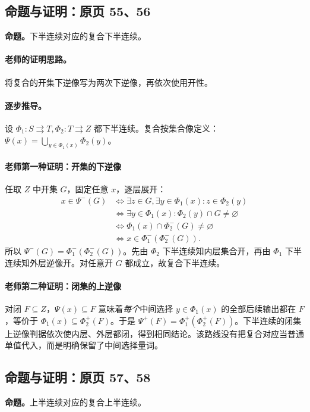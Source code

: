 \subsection{命题与证明：原页 55、56}

\textbf{命题。}下半连续对应的复合下半连续。

\paragraph{老师的证明思路。}将复合的开集下逆像写为两次下逆像，再依次使用开性。

\paragraph{逐步推导。}
设 $\Phi_1:S\rightrightarrows T,\Phi_2:T\rightrightarrows Z$ 都下半连续。复合按集合像定义：$\Psi(x)=\bigcup_{y\in\Phi_1(x)}\Phi_2(y)$。
\paragraph{老师第一种证明：开集的下逆像}
任取 $Z$ 中开集 $G$，固定任意 $x$，逐层展开：
\begin{align*}
x\in\Psi^-(G)&\iff\exists z\in G,\exists y\in\Phi_1(x):z\in\Phi_2(y)\\
&\iff\exists y\in\Phi_1(x):\Phi_2(y)\cap G\ne\varnothing\\
&\iff\Phi_1(x)\cap\Phi_2^-(G)\ne\varnothing\\
&\iff x\in\Phi_1^-(\Phi_2^-(G)).
\end{align*}
所以 $\Psi^-(G)=\Phi_1^-(\Phi_2^-(G))$。先由 $\Phi_2$ 下半连续知内层集合开，再由 $\Phi_1$ 下半连续知外层逆像开。对任意开 $G$ 都成立，故复合下半连续。
\paragraph{老师第二种证明：闭集的上逆像}
对闭 $F\subseteq Z$，$\Psi(x)\subseteq F$ 意味着\emph{每个}中间选择 $y\in\Phi_1(x)$ 的全部后续输出都在 $F$，等价于 $\Phi_1(x)\subseteq\Phi_2^+(F)$。于是 $\Psi^+(F)=\Phi_1^+(\Phi_2^+(F))$。下半连续的闭集上逆像判据依次使内层、外层都闭，得到相同结论。该路线没有把复合对应当普通单值代入，而是明确保留了中间选择量词。


\subsection{命题与证明：原页 57、58}

\textbf{命题。}上半连续对应的复合上半连续。

